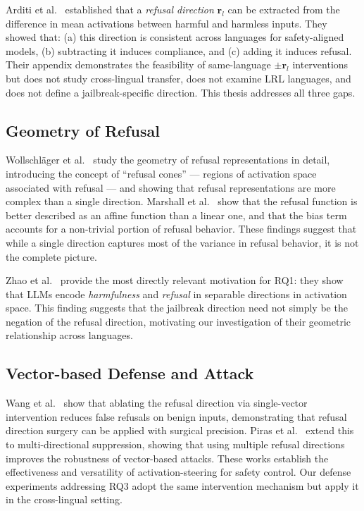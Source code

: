 Arditi et al.~\citeyearpar{arditi2024refusal} established that a \textit{refusal direction} $\mathbf{r}_l$ can be extracted from the difference in mean activations between harmful and harmless inputs. They showed that: (a) this direction is consistent across languages for safety-aligned models, (b) subtracting it induces compliance, and (c) adding it induces refusal. Their appendix demonstrates the feasibility of same-language $\pm\mathbf{r}_l$ interventions but does not study cross-lingual transfer, does not examine LRL languages, and does not define a jailbreak-specific direction. This thesis addresses all three gaps.

\subsection{Geometry of Refusal}

Wollschl{\"a}ger et al.~\citeyearpar{wollschlager2025geometry} study the geometry of refusal representations in detail, introducing the concept of ``refusal cones'' — regions of activation space associated with refusal — and showing that refusal representations are more complex than a single direction. Marshall et al.~\citeyearpar{marshall2024refusal} show that the refusal function is better described as an affine function than a linear one, and that the bias term accounts for a non-trivial portion of refusal behavior. These findings suggest that while a single direction captures most of the variance in refusal behavior, it is not the complete picture.

Zhao et al.~\citeyearpar{zhao2026llms} provide the most directly relevant motivation for RQ1: they show that LLMs encode \textit{harmfulness} and \textit{refusal} in separable directions in activation space. This finding suggests that the jailbreak direction need not simply be the negation of the refusal direction, motivating our investigation of their geometric relationship across languages.

\subsection{Vector-based Defense and Attack}

Wang et al.~\citeyearpar{wang2025surgical} show that ablating the refusal direction via single-vector intervention reduces false refusals on benign inputs, demonstrating that refusal direction surgery can be applied with surgical precision. Piras et al.~\citeyearpar{piras2026som} extend this to multi-directional suppression, showing that using multiple refusal directions improves the robustness of vector-based attacks. These works establish the effectiveness and versatility of activation-steering for safety control. Our defense experiments addressing RQ3 adopt the same intervention mechanism but apply it in the cross-lingual setting.


